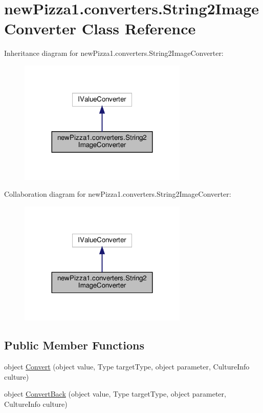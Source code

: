 \hypertarget{classnewPizza1_1_1converters_1_1String2ImageConverter}{}\section{new\+Pizza1.\+converters.\+String2\+Image\+Converter Class Reference}
\label{classnewPizza1_1_1converters_1_1String2ImageConverter}


Inheritance diagram for new\+Pizza1.\+converters.\+String2\+Image\+Converter\+:
\nopagebreak
\begin{figure}[H]
\begin{center}
\leavevmode
\includegraphics[width=227pt]{classnewPizza1_1_1converters_1_1String2ImageConverter__inherit__graph}
\end{center}
\end{figure}


Collaboration diagram for new\+Pizza1.\+converters.\+String2\+Image\+Converter\+:
\nopagebreak
\begin{figure}[H]
\begin{center}
\leavevmode
\includegraphics[width=227pt]{classnewPizza1_1_1converters_1_1String2ImageConverter__coll__graph}
\end{center}
\end{figure}
\subsection*{Public Member Functions}
\begin{DoxyCompactItemize}
\item 
object \hyperlink{classnewPizza1_1_1converters_1_1String2ImageConverter_acdb25935515a4953373954bc2e61586d}{Convert} (object value, Type target\+Type, object parameter, Culture\+Info culture)
\item 
object \hyperlink{classnewPizza1_1_1converters_1_1String2ImageConverter_a6807873b25db84bc4ac03253528fdc11}{Convert\+Back} (object value, Type target\+Type, object parameter, Culture\+Info culture)
\end{DoxyCompactItemize}
